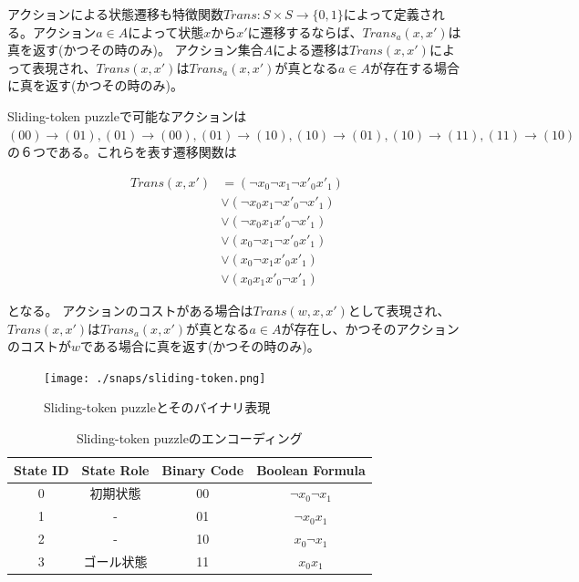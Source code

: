 \documentclass[b5paper]{report}
\begin{document}
アクションによる状態遷移も特徴関数$Trans: S \times S \rightarrow \{0, 1\}$によって定義される。アクション$a \in A$によって状態$x$から$x'$に遷移するならば、$Trans_a(x,x')$は真を返す(かつその時のみ)。
アクション集合$A$による遷移は$Trans(x,x')$によって表現され、$Trans(x,x')$は$Trans_a(x,x')$が真となる$a \in A$が存在する場合に真を返す(かつその時のみ)。

Sliding-token puzzleで可能なアクションは$(00) \rightarrow (01), (01) \rightarrow (00), (01) \rightarrow (10), (10) \rightarrow (01), (10) \rightarrow (11), (11) \rightarrow (10)$の６つである。これらを表す遷移関数は

\begin{equation}
\begin{split}
	Trans(x,x') &= (\lnot x_0 \lnot x_1 \lnot x'_0 x'_1) \\
		&\lor (\lnot x_0 x_1 \lnot x'_0 \lnot x'_1) \\
		&\lor (\lnot x_0 x_1 x'_0 \lnot x'_1) \\
		&\lor (x_0 \lnot x_1 \lnot x'_0 x'_1) \\
		&\lor (x_0 \lnot x_1 x'_0 x'_1) \\
		&\lor (x_0 x_1 x'_0 \lnot x'_1)
\end{split}
\end{equation}

となる。
アクションのコストがある場合は$Trans(w, x, x')$として表現され、$Trans(x,x')$は$Trans_a(x,x')$が真となる$a \in A$が存在し、かつそのアクションのコストが$w$である場合に真を返す(かつその時のみ)。



\begin{figure}
\texttt{[image: ./snaps/sliding-token.png]}
\caption{Sliding-token puzzleとそのバイナリ表現}
\label{fig:sliding-token}
\end{figure}

\begin{table}
\centering
\caption{Sliding-token puzzleのエンコーディング}
\label{tbl:sliding-token}
\begin{tabular}{c|c|c|c}
	State ID & State Role & Binary Code & Boolean Formula \\ \hline
	0		& 初期状態	& 00				& $\lnot x_0 \lnot x_1$ \\	
	1		& -			& 01				& $\lnot x_0  x_1$ \\	
	2		& -			& 10				& $x_0 \lnot x_1$ \\	
	3		& ゴール状態	& 11				& $x_0 x_1$ \\	
\end{tabular}
\end{table}
\end{document}
